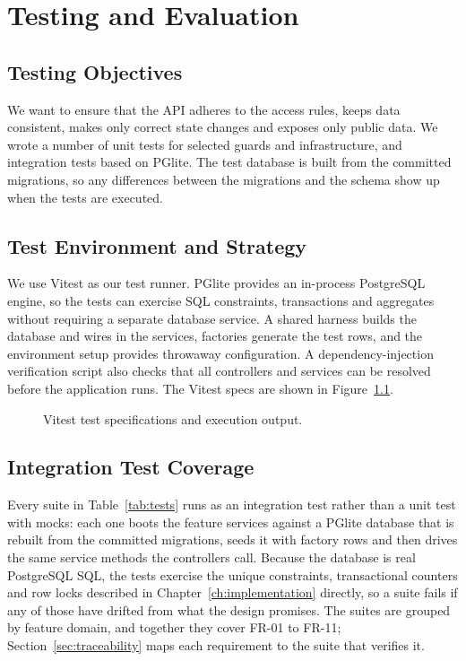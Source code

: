 \chapter{Testing and Evaluation}
\label{ch:testing}

\section{Testing Objectives}
\label{sec:testing-objectives}
We want to ensure that the API adheres to the access rules, keeps data consistent, makes only correct state changes and exposes only public data. We wrote a number of unit tests for selected guards and infrastructure, and integration tests based on PGlite. The test database is built from the committed migrations, so any differences between the migrations and the schema show up when the tests are executed.

\section{Test Environment and Strategy}
We use Vitest as our test runner. PGlite provides an in-process PostgreSQL engine, so the tests can exercise SQL constraints, transactions and aggregates without requiring a separate database service. A shared harness builds the database and wires in the services, factories generate the test rows, and the environment setup provides throwaway configuration. A dependency-injection verification script also checks that all controllers and services can be resolved before the application runs. The Vitest specs are shown in Figure~\ref{fig:testing}.

\clearpage
\begin{figure}[H]
    \centering
    \caption{Vitest test specifications and execution output.}
    \label{fig:testing}
\end{figure}

\section{Integration Test Coverage}
Every suite in Table~\ref{tab:tests} runs as an integration test rather than a unit test with mocks: each one boots the feature services against a PGlite database that is rebuilt from the committed migrations, seeds it with factory rows and then drives the same service methods the controllers call. Because the database is real PostgreSQL SQL, the tests exercise the unique constraints, transactional counters and row locks described in Chapter~\ref{ch:implementation} directly, so a suite fails if any of those have drifted from what the design promises. The suites are grouped by feature domain, and together they cover FR-01 to FR-11; Section~\ref{sec:traceability} maps each requirement to the suite that verifies it.

